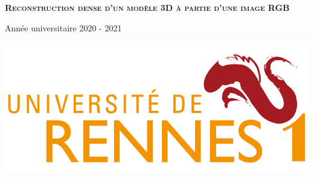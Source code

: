 \begin{titlepage}
\begin{center}
    \vspace{4cm}

    \textsc{\Huge \textbf{Reconstruction dense d'un modèle 3D à partie d'une image RGB}}\\    
    \vfill

    \begin{minipage}{0.45\textwidth}
      \begin{flushleft}
        \vspace{0.5cm}
        {\large Année universitaire 2020 - 2021}
      \end{flushleft}
    \end{minipage}
    \begin{minipage}{0.45\textwidth}
      \begin{flushright}
        \includegraphics[width=0.9\columnwidth]{datas/logo_univ.png}~\\
      \end{flushright}
    \end{minipage}

  \end{center}
\end{titlepage}
